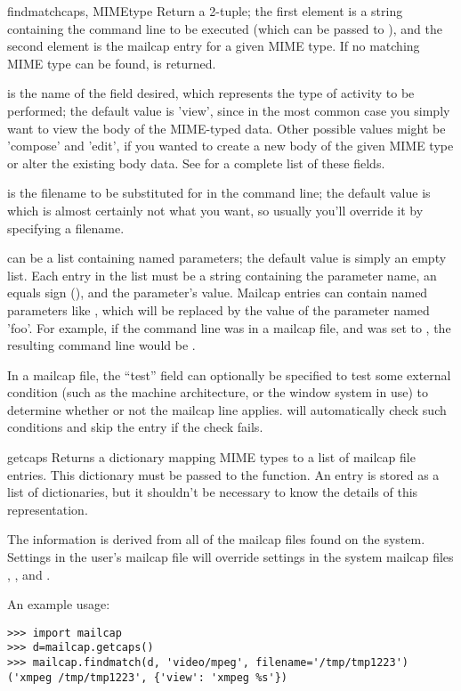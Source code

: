 \begin{funcdesc}{findmatch}{caps, MIMEtype%
                            }
Return a 2-tuple; the first element is a string containing the command
line to be executed
(which can be passed to ), and the second element is
the mailcap entry for a given MIME type.  If no matching MIME
type can be found,  is returned.

 is the name of the field desired, which represents the type
of activity to be performed; the default value is 'view', since in the 
most common case you simply want to view the body of the MIME-typed
data.  Other possible values might be 'compose' and 'edit', if you
wanted to create a new body of the given MIME type or alter the
existing body data.  See  for a complete list of these
fields.

 is the filename to be substituted for  in the
command line; the default value is
 which is almost certainly not what you want, so
usually you'll override it by specifying a filename.

 can be a list containing named parameters; the default
value is simply an empty list.  Each entry in the list must be a
string containing the parameter name, an equals sign (\character{=}),
and the parameter's value.  Mailcap entries can contain 
named parameters like , which will be replaced by the
value of the parameter named 'foo'.  For example, if the command line
was in a mailcap file, and  was set to \code{['id=1',
'number=2', 'total=3']}, the resulting command line would be 
.  

In a mailcap file, the ``test'' field can optionally be specified to
test some external condition (such as the machine architecture, or the
window system in use) to determine whether or not the mailcap line
applies.   will automatically check such
conditions and skip the entry if the check fails.
\end{funcdesc}

\begin{funcdesc}{getcaps}{}
Returns a dictionary mapping MIME types to a list of mailcap file
entries. This dictionary must be passed to the 
function.  An entry is stored as a list of dictionaries, but it
shouldn't be necessary to know the details of this representation.

The information is derived from all of the mailcap files found on the
system. Settings in the user's mailcap file 
will override settings in the system mailcap files
, , and
.
\end{funcdesc}

An example usage:
\begin{verbatim}
>>> import mailcap
>>> d=mailcap.getcaps()
>>> mailcap.findmatch(d, 'video/mpeg', filename='/tmp/tmp1223')
('xmpeg /tmp/tmp1223', {'view': 'xmpeg %s'})
\end{verbatim}

